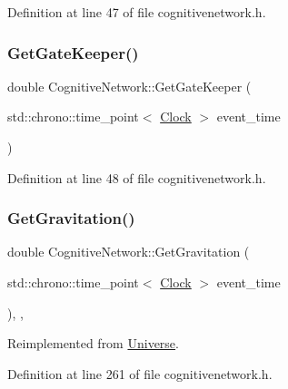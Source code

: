 Definition at line 47 of file cognitivenetwork.\+h.

\mbox{\label{class_cognitive_network_a3a9be1c6697d063b0836cdcdc7a2600c}} 
\subsubsection{\texorpdfstring{Get\+Gate\+Keeper()}{GetGateKeeper()}}
{\footnotesize\ttfamily double Cognitive\+Network\+::\+Get\+Gate\+Keeper (\begin{DoxyParamCaption}\item[{std\+::chrono\+::time\+\_\+point$<$ \hyperlink{universe_8h_a0ef8d951d1ca5ab3cfaf7ab4c7a6fd80}{Clock} $>$}]{event\+\_\+time }\end{DoxyParamCaption})\hspace{0.3cm}{\ttfamily [inline]}}



Definition at line 48 of file cognitivenetwork.\+h.

\mbox{\label{class_cognitive_network_a4b5150310288c52f00ecb745ae9e7f86}} 
\subsubsection{\texorpdfstring{Get\+Gravitation()}{GetGravitation()}}
{\footnotesize\ttfamily double Cognitive\+Network\+::\+Get\+Gravitation (\begin{DoxyParamCaption}\item[{std\+::chrono\+::time\+\_\+point$<$ \hyperlink{universe_8h_a0ef8d951d1ca5ab3cfaf7ab4c7a6fd80}{Clock} $>$}]{event\+\_\+time }\end{DoxyParamCaption})\hspace{0.3cm}{\ttfamily [inline]}, {\ttfamily [final]}, {\ttfamily [virtual]}}



Reimplemented from \hyperlink{class_universe_ab0404e774ee0ed66b597ff5b8e989446}{Universe}.



Definition at line 261 of file cognitivenetwork.\+h.

